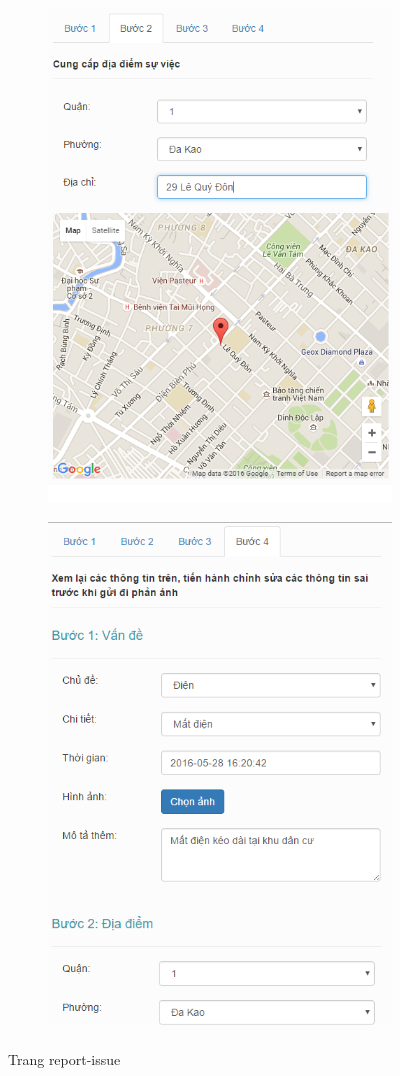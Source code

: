 \documentclass[a4paper]{article}
\begin{document}
\begin{itemize}
\begin{figure}[h]
\begin{subfigure}{.5\textwidth}
  			\caption{}
  			\label{fig:sub2}
		\end{subfigure}
		\begin{subfigure}{.5\textwidth}
  			\centering
  			\includegraphics[width=0.7\linewidth]{Step2.PNG}
  			\caption{}
  			\label{fig:sub2}
		\end{subfigure}%
		\begin{subfigure}{.5\textwidth}
  			\centering
  			\includegraphics[width=0.7\linewidth]{Step4.PNG}
  			\caption{}
  			\label{fig:sub2}
		\end{subfigure}
		\caption{Trang report-issue}
	\end{figure}
\end{itemize}
\end{document}
